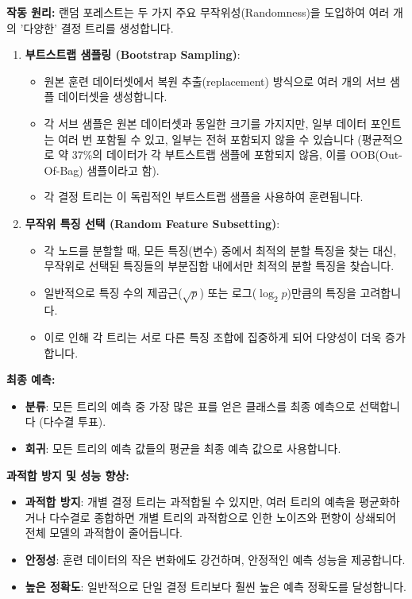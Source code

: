\documentclass[11pt,a4paper]{article}
\begin{document}
\textbf{작동 원리:}
랜덤 포레스트는 두 가지 주요 무작위성(Randomness)을 도입하여 여러 개의 '다양한' 결정 트리를 생성합니다.
\begin{enumerate}
    \item \textbf{부트스트랩 샘플링 (Bootstrap Sampling)}:
        \begin{itemize}
            \item 원본 훈련 데이터셋에서 복원 추출(replacement) 방식으로 여러 개의 서브 샘플 데이터셋을 생성합니다.
            \item 각 서브 샘플은 원본 데이터셋과 동일한 크기를 가지지만, 일부 데이터 포인트는 여러 번 포함될 수 있고, 일부는 전혀 포함되지 않을 수 있습니다 (평균적으로 약 37\%의 데이터가 각 부트스트랩 샘플에 포함되지 않음, 이를 OOB(Out-Of-Bag) 샘플이라고 함).
            \item 각 결정 트리는 이 독립적인 부트스트랩 샘플을 사용하여 훈련됩니다.
        \end{itemize}
    \item \textbf{무작위 특징 선택 (Random Feature Subsetting)}:
        \begin{itemize}
            \item 각 노드를 분할할 때, 모든 특징(변수) 중에서 최적의 분할 특징을 찾는 대신, 무작위로 선택된 특징들의 부분집합 내에서만 최적의 분할 특징을 찾습니다.
            \item 일반적으로 특징 수의 제곱근($\sqrt{p}$) 또는 로그($\log_2 p$)만큼의 특징을 고려합니다.
            \item 이로 인해 각 트리는 서로 다른 특징 조합에 집중하게 되어 다양성이 더욱 증가합니다.
        \end{itemize}
\end{enumerate}

\textbf{최종 예측:}
\begin{itemize}
    \item \textbf{분류}: 모든 트리의 예측 중 가장 많은 표를 얻은 클래스를 최종 예측으로 선택합니다 (다수결 투표).
    \item \textbf{회귀}: 모든 트리의 예측 값들의 평균을 최종 예측 값으로 사용합니다.
\end{itemize}

\textbf{과적합 방지 및 성능 향상:}
\begin{itemize}
    \item \textbf{과적합 방지}: 개별 결정 트리는 과적합될 수 있지만, 여러 트리의 예측을 평균화하거나 다수결로 종합하면 개별 트리의 과적합으로 인한 노이즈와 편향이 상쇄되어 전체 모델의 과적합이 줄어듭니다.
    \item \textbf{안정성}: 훈련 데이터의 작은 변화에도 강건하며, 안정적인 예측 성능을 제공합니다.
    \item \textbf{높은 정확도}: 일반적으로 단일 결정 트리보다 훨씬 높은 예측 정확도를 달성합니다.
\end{itemize}
\end{document}

